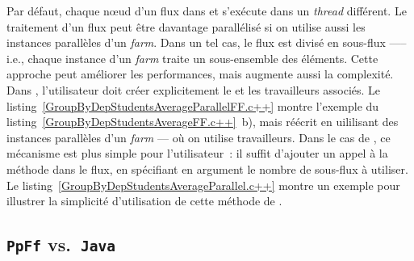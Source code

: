 Par d\'efaut, chaque nœud d'un flux dans  et  s'ex\'ecute dans un \emph{thread} diff\'erent. Le traitement d'un flux peut \^etre davantage parall\'elis\'e si on utilise aussi les instances parall\`eles d'un \emph{farm}. Dans un tel cas, le flux est divis\'e en sous-flux —-- i.e., chaque instance d'un \emph{farm} traite un sous-ensemble des \'el\'ements. Cette approche peut améliorer les performances, mais augmente aussi la complexit\'e. Dans , l'utilisateur doit cr\'eer explicitement le  et les travailleurs associés. Le listing~\ref{GroupByDepStudentsAverageParallelFF.c++} montre l'exemple du listing~\ref{GroupByDepStudentsAverageFF.c++}~b), mais réécrit en uililisant des instances parall\`eles d'un \emph{farm} --- où on utilise  travailleurs. Dans le cas de , ce m\'ecanisme est plus simple pour l'utilisateur~: il suffit d'ajouter un appel à  la m\'ethode  dans le flux, en sp\'ecifiant en argument le nombre de sous-flux \`a utiliser. Le listing~\ref{GroupByDepStudentsAverageParallel.c++} montre un exemple pour illustrer la simplicit\'e d'utilisation de cette méthode de .




\subsection{\texttt{PpFf} vs.\ \texttt{Java}}




